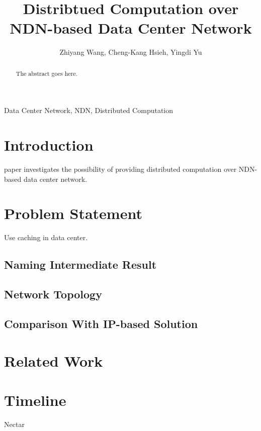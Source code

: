 \documentclass[journal]{IEEEtran}
\begin{document}
\title{Distribtued Computation over NDN-based Data Center Network}

\author{Zhiyang Wang,
        Cheng-Kang Hsieh,
        Yingdi Yu}

\maketitle

\begin{abstract}
The abstract goes here.
\end{abstract}

\begin{IEEEkeywords}
Data Center Network, NDN, Distributed Computation
\end{IEEEkeywords}

\IEEEpeerreviewmaketitle



\section{Introduction}
 paper investigates the possibility of providing
distributed computation over NDN-based data center network.
\section{Problem Statement}
Use caching in data center.
\subsection{Naming Intermediate Result}
\subsection{Network Topology}
\subsection{Comparison With IP-based Solution}
\section{Related Work}
\section{Timeline}

\begin{thebibliography}{1}
Nectar
\end{thebibliography}
\end{document}
